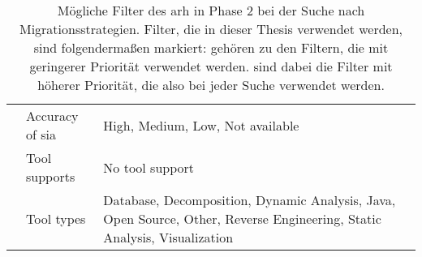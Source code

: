 \begin{table}[!h]
\begin{tabular}{m{2cm} m{2cm} m{9cm}}
    & Accuracy of \gls{sia} & High, Medium, Low, Not available \\ \cline{2-3}
    & Tool supports &  No tool support \\ \cline{2-3}
    & Tool types & Database, Decomposition, Dynamic Analysis, Java, Open Source, Other, Reverse Engineering, Static Analysis, Visualization \\
    \bottomrule
  \end{tabular}
  \caption[Mögliche Filter des \gls{arh} in Phase 2]{
  	Mögliche Filter des \gls{arh} in Phase 2 bei der Suche nach Migrationsstrategien.
  	Filter, die in dieser Thesis verwendet werden, sind folgendermaßen markiert:
     gehören zu den Filtern, die mit geringerer Priorität verwendet werden.
     sind dabei die Filter mit höherer Priorität, die also bei jeder Suche verwendet werden.
  }
  \label{tab:phase2-filter}
\end{table}
